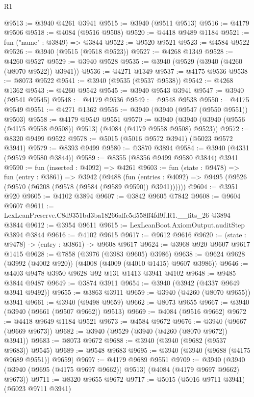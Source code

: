 \begin{lexlean}{R1}
\begin{coremodule}
@9513 := @3940 @4261 @3941
@9515 := @3940 (@9511 @9513)
@9516 := @4179 @9506
@9518 := @4084 (@9516 @9508)
@9520 := @4418 @9489 @1184
@9521 := fun ("name" : @3849) => @3844
@9522 := @9520 @9521
@9523 := @4584 @9522
@9526 := @3940 (@9515 (@9518 @9523))
@9527 := @4268 @1349
@9528 := @4260 @9527
@9529 := @3940 @9528
@9535 := @3940 (@9529 (@3940 (@4260 (@8070 @9522)) @3941))
@9536 := @4271 @1349
@9537 := @4175 @9536
@9538 := @8073 @9522
@9541 := @3940 (@9535 (@9537 @9538))
@9542 := @4268 @1362
@9543 := @4260 @9542
@9545 := @3940 @9543 @3941
@9547 := @3940 (@9541 @9545)
@9548 := @4179 @9536
@9549 := @9548 @9538
@9550 := @4175 @9549
@9551 := @4271 @1362
@9556 := @3940 (@3940 (@9547 (@9550 @9551)) @9503)
@9558 := @4179 @9549 @9551
@9570 := @3940 (@3940 (@3940 (@9556 (@4175 @9558 @9508)) @9513) (@4084 (@4179 @9558 @9508) @9523))
@9572 := @8320 @9499 @9522
@9578 := @5015 (@5016 @9572 @3941) (@5023 @9572 @3941)
@9579 := @8393 @9499
@9580 := @3870 @3894
@9584 := @3940 (@4331 (@9579 @9580 @3844))
@9589 := @8355 (@8356 @9499 @9580 @3844) @3941
@9590 := fun (inserted : @4092) => @4261
@9603 := fun (state : @9478) =>
  fun (entry : @3861) =>
  @3942
    (@9488
      (fun (entries : @4092) => @9495 (@9526 (@9570 (@6208 (@9578 (@9584 (@9589 @9590)) @3941))))))
@9604 := @3951 @920
@9605 := @4102 @3894
@9607 := @3842 @9605 @7842
@9608 := @9604 @9607
@9611 := LexLeanPreserve.C8d9351bd3ba18266affe5d558ff4fd9f.R1.__fits_26 @3894 @3844
@9612 := @3954 @9611
@9615 := LexLeanBoot.AxiomOutput.auditStep @3894 @3844
@9616 := @4102 @9615
@9617 := @9612 @9616
@9620 := (state : @9478) -> (entry : @3861) -> @9608 @9617
@9624 := @3968 @920 @9607 @9617 @1415
@9628 := @7858 (@3976 (@3983 @9605) @3986)
@9638 := @9624 @9628 (@3992 (@4002 @920)) (@4008 (@4009 (@4010 @1415) @9607 @3986))
@9646 := @4403 @9478 @3950 @9628 @92 @131 @1413 @3941 @4102
@9648 := @9485 @3844 @9487
@9649 := @3874 @3911
@9654 := @3940 (@3942 (@4337 @9649 @3941 @9492))
@9655 := @3863 @3911
@9659 := @3940 (@4260 (@8070 @9655)) @3941
@9661 := @3940 (@9498 @9659)
@9662 := @8073 @9655
@9667 := @3940 (@3940 (@9661 (@9507 @9662)) @9513)
@9669 := @4084 (@9516 @9662)
@9672 := @4418 @9649 @1184 @9521
@9673 := @4584 @9672
@9676 := @3940 (@9667 (@9669 @9673))
@9682 := @3940 (@9529 (@3940 (@4260 (@8070 @9672)) @3941))
@9683 := @8073 @9672
@9688 := @3940 (@3940 (@9682 (@9537 @9683)) @9545)
@9689 := @9548 @9683
@9695 := @3940 (@3940 (@9688 (@4175 @9689 @9551)) @9659)
@9697 := @4179 @9689 @9551
@9709 := @3940 (@3940 (@3940 (@9695 (@4175 @9697 @9662)) @9513) (@4084 (@4179 @9697 @9662) @9673))
@9711 := @8320 @9655 @9672
@9717 := @5015 (@5016 @9711 @3941) (@5023 @9711 @3941)

\end{coremodule}
\end{lexlean}
